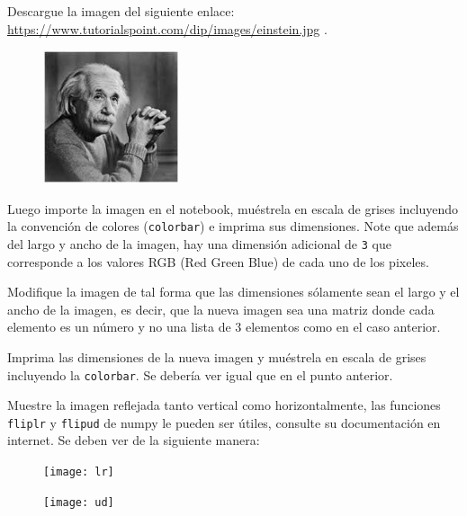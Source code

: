\documentclass[11pt,letterpaper]{exam}
\begin{document}
\begin{questions}
 

Descargue la imagen del siguiente enlace: \url{https://www.tutorialspoint.com/dip/images/einstein.jpg} .

\begin{figure}[H]
  \centering
  \includegraphics[width=4cm]{einstein}
\end{figure}

Luego importe la imagen en el notebook, mu\'estrela en escala de grises incluyendo la convenci\'on de colores (\verb'colorbar') e imprima sus dimensiones. Note que adem\'as del largo y ancho de la imagen, hay una dimensi\'on adicional de \verb'3' que corresponde a los valores RGB (Red Green Blue) de cada uno de los pixeles.



Modifique la imagen de tal forma que las dimensiones s\'olamente sean el largo y el ancho de la imagen, es decir, que la nueva imagen sea una matriz donde cada elemento es un n\'umero y no una lista de $3$ elementos como en el caso anterior.

Imprima las dimensiones de la nueva imagen y mu\'estrela en escala de grises incluyendo la \verb'colorbar'. Se deber\'ia ver igual que en el punto anterior. 


Muestre la imagen reflejada tanto vertical como horizontalmente, las funciones \verb'fliplr' y \verb'flipud' de numpy le pueden ser \'utiles, consulte su documentaci\'on en internet. Se deben ver de la siguiente manera:

\begin{figure}[H]
  \centering
  \texttt{[image: lr]}
\end{figure}
\begin{figure}[H]
  \centering
  \texttt{[image: ud]}
\end{figure}


\end{questions}
\end{document}
